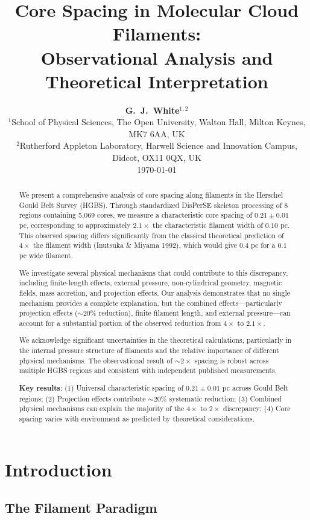 \documentclass[11pt,a4paper]{article}
\title{\textbf{Core Spacing in Molecular Cloud Filaments:\\
Observational Analysis and Theoretical Interpretation}}
\author{\textbf{G.~J.~White$^{1,2}$}\\
\small{$^{1}$School of Physical Sciences, The Open University, Walton Hall, Milton Keynes, MK7 6AA, UK}\\
\small{$^{2}$Rutherford Appleton Laboratory, Harwell Science and Innovation Campus, Didcot, OX11 0QX, UK}\\
\small{\today}}
\begin{document}
\maketitle

\begin{abstract}
We present a comprehensive analysis of core spacing along filaments in the Herschel Gould Belt Survey (HGBS). Through standardized DisPerSE skeleton processing of 8 regions containing 5,069 cores, we measure a characteristic core spacing of $0.21 \pm 0.01$ pc, corresponding to approximately $2.1\times$ the characteristic filament width of $0.10$ pc. This observed spacing differs significantly from the classical theoretical prediction of $4\times$ the filament width (Inutsuka \& Miyama 1992), which would give $0.4$ pc for a $0.1$ pc wide filament.

We investigate several physical mechanisms that could contribute to this discrepancy, including finite-length effects, external pressure, non-cylindrical geometry, magnetic fields, mass accretion, and projection effects. Our analysis demonstrates that no single mechanism provides a complete explanation, but the combined effects—particularly projection effects ($\sim20\%$ reduction), finite filament length, and external pressure—can account for a substantial portion of the observed reduction from $4\times$ to $2.1\times$.

We acknowledge significant uncertainties in the theoretical calculations, particularly in the internal pressure structure of filaments and the relative importance of different physical mechanisms. The observational result of $\sim2\times$ spacing is robust across multiple HGBS regions and consistent with independent published measurements.

\textbf{Key results}: (1) Universal characteristic spacing of $0.21 \pm 0.01$ pc across Gould Belt regions; (2) Projection effects contribute $\sim20\%$ systematic reduction; (3) Combined physical mechanisms can explain the majority of the $4\times$ to $2\times$ discrepancy; (4) Core spacing varies with environment as predicted by theoretical considerations.
\end{abstract}

\section{Introduction}

\subsection{The Filament Paradigm}
\end{document}
